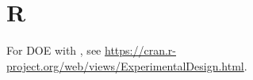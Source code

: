 


\chapter{R}
\label{apx:r}

For DOE with \R, see \url{https://cran.r-project.org/web/views/ExperimentalDesign.html}.

